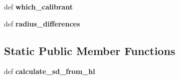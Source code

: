 \begin{DoxyCompactItemize}
\item 
\hypertarget{classmyDetector_1_1myDetector_a948335ed1ecb680f41d97f08ba221607}{def {\bfseries which\-\_\-calibrant}}\label{classmyDetector_1_1myDetector_a948335ed1ecb680f41d97f08ba221607}

\item 
\hypertarget{classmyDetector_1_1myDetector_add03d9231cadea51fb419890acdcf271}{def {\bfseries radius\-\_\-differences}}\label{classmyDetector_1_1myDetector_add03d9231cadea51fb419890acdcf271}

\end{DoxyCompactItemize}
\subsection*{Static Public Member Functions}
\begin{DoxyCompactItemize}
\item 
\hypertarget{classmyDetector_1_1myDetector_af1fe29daf9b0c65bb59dbee747583619}{def {\bfseries calculate\-\_\-sd\-\_\-from\-\_\-hl}}\label{classmyDetector_1_1myDetector_af1fe29daf9b0c65bb59dbee747583619}

\end{DoxyCompactItemize}
